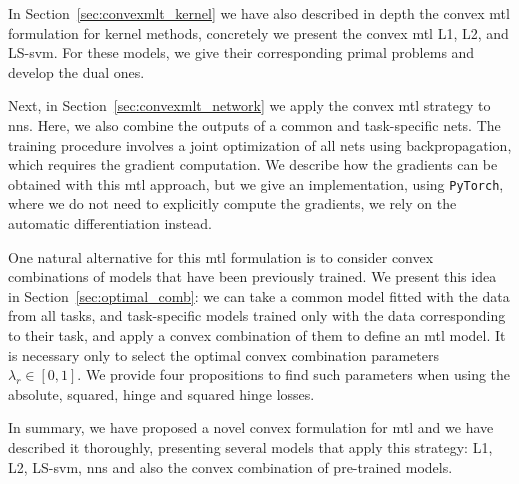 %
In Section~\ref{sec:convexmlt_kernel} we have also described in depth the convex \acrshort{mtl} formulation for kernel methods, concretely we present the convex \acrshort{mtl} L1, L2, and LS-\acrshort{svm}. For these models, we give their corresponding primal problems and develop the dual ones.
%

Next, in Section~\ref{sec:convexmlt_network} we apply the convex \acrshort{mtl} strategy to \acrshort{nns}. Here, we also combine the outputs of a common and task-specific nets. The training procedure involves a joint optimization of all nets using backpropagation, which requires the gradient computation.
We describe how the gradients can be obtained with this \acrshort{mtl} approach, but we give an implementation, using \texttt{PyTorch}, where we do not need to explicitly compute the gradients, we rely on the automatic differentiation instead.

%
One natural alternative for this \acrshort{mtl} formulation is to consider convex combinations of models that have been previously trained. We present this idea in Section~\ref{sec:optimal_comb}: we can take a common model fitted with the data from all tasks, and task-specific models trained only with the data corresponding to their task, and apply a convex combination of them to define an \acrshort{mtl} model. It is necessary only to select the optimal convex combination parameters $\lambda_r \in [0, 1]$. We provide four propositions to find such parameters when using the absolute, squared, hinge and squared hinge losses.

%
In summary, we have proposed a novel convex formulation for \acrshort{mtl} and we have described it thoroughly, presenting several models that apply this strategy: L1, L2, LS-\acrshort{svm}, \acrshort{nns} and also the convex combination of pre-trained models.